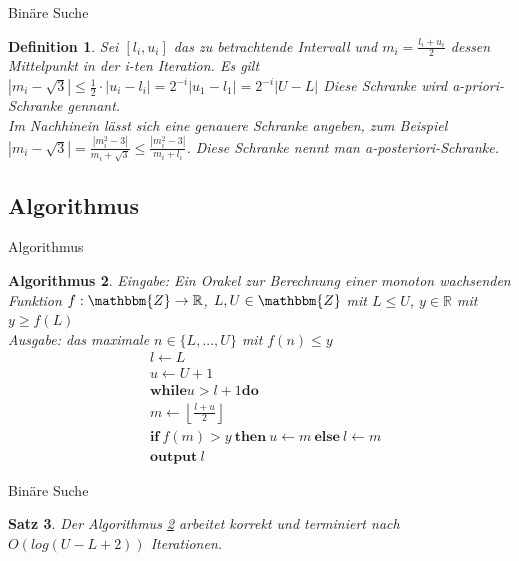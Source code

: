 \documentclass{beamer}
\newcommand{\Z}{\mathbbm{Z}} %
\newcommand{\R}{\mathbb{R}} %
\newtheorem{satz}{Satz}[section]
\newtheorem{defi}[satz]{Definition}
\newtheorem{algorithmus}[satz]{Algorithmus}
\begin{document}
   \begin{frame}{Binäre Suche}
       \begin{defi}
           Sei $[l_i,u_i]$ das zu betrachtende Intervall und $m_i= \frac{l_i+u_i}{2}$ dessen Mittelpunkt in der i-ten Iteration. 
           Es gilt $|m_i-\sqrt{3}|\leq \frac{1}{2} \cdot|u_i-l_i|=2^{-i}|u_1-l_1|= 2^{-i}|U-L|$
           Diese Schranke wird a-priori-Schranke gennant. \\
           Im Nachhinein lässt sich eine genauere Schranke angeben, zum Beispiel $|m_i-\sqrt{3}|=\frac{|m_i^2-3|}{m_i+ \sqrt{3}}\leq \frac{|m_i^2-3|}{m_i+l_i}$. Diese Schranke nennt man a-posteriori-Schranke. 
       \end{defi}
  \end{frame}
  
  \subsection{Algorithmus}
  
  \begin{frame}{Algorithmus}
     \begin{algorithmus}
       Eingabe: Ein Orakel zur Berechnung einer monoton wachsenden Funktion $f: \Z \to \R$, $L,U \in \Z$ mit $L\leq U$, $y \in \R$ mit $y \geq f(L)$ \\ 
    Ausgabe: das maximale $n \in \{L,...,U\}$ mit $f(n) \leq y$ 
    \begin{align*}
        &l \leftarrow L \\ 
       &u  \leftarrow  U+1 \\
       &\textbf{while} u>l+1 \textbf{do} \\
       &m \leftarrow \left \lfloor \frac{l+u}{2} \right \rfloor \\
       & \textbf{if} \: f(m) > y \: \textbf{then} \: u \leftarrow m \: \textbf{else} \: l \leftarrow m \\ 
       & \textbf{output} \: l
    \end{align*}
    \label{binäre suche}
    \end{algorithmus}
  \end{frame}

  \begin{frame}{Binäre Suche}
      \begin{satz}
      Der Algorithmus \ref{binäre suche} arbeitet korrekt und terminiert nach $O(log(U-L+2))$ Iterationen.  
     \end{satz}
  \end{frame}
\end{document}
